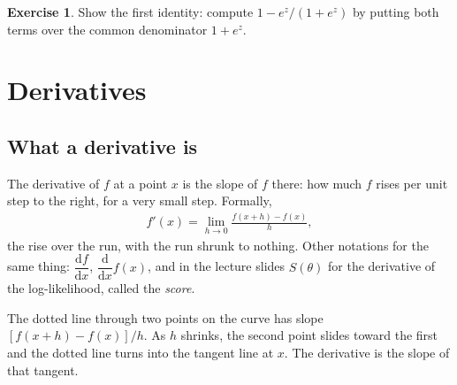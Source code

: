 \documentclass[11pt]{article}
\theoremstyle{definition}
\newtheorem{exercise}{Exercise}
\newcommand{\dd}{\mathrm{d}}
\begin{document}
\begin{exercise}
Show the first identity: compute $1 - e^{z}/(1+e^{z})$ by putting both
terms over the common denominator $1+e^{z}$.
\end{exercise}

\section{Derivatives}
\label{sec:deriv}

\subsection{What a derivative is}

The derivative of $f$ at a point $x$ is the slope of $f$ there: how much
$f$ rises per unit step to the right, for a very small step. Formally,
\begin{align*}
  f'(x) = \lim_{h \to 0}\frac{f(x+h) - f(x)}{h},
\end{align*}
the rise over the run, with the run shrunk to nothing. Other notations for
the same thing: $\dfrac{\dd f}{\dd x}$, $\dfrac{\dd}{\dd x}f(x)$, and in the
lecture slides $S(\theta)$ for the derivative of the log-likelihood, called
the \emph{score}.

\begin{center}
\end{center}

The dotted line through two points on the curve has slope
$[f(x+h) - f(x)]/h$. As $h$ shrinks, the second point slides toward the
first and the dotted line turns into the tangent line at $x$. The
derivative is the slope of that tangent.
\end{document}
